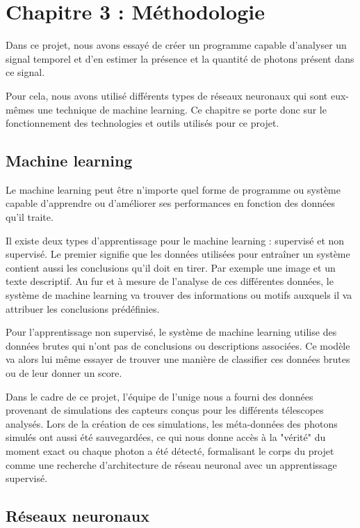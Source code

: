 \chapter{Chapitre 3 : Méthodologie}

Dans ce projet, nous avons essayé de créer un programme capable d'analyser un signal temporel et 
d'en estimer la présence et la quantité de photons présent dans ce signal.

Pour cela, nous avons utilisé différents types de réseaux neuronaux qui sont eux-mêmes une technique de machine learning.
Ce chapitre se porte donc sur le fonctionnement des technologies et outils utilisés pour ce projet. 

\section{Machine learning}

Le machine learning peut être n'importe quel forme de programme ou système capable d'apprendre ou d'améliorer ses performances
en fonction des données qu'il traite.

Il existe deux types d'apprentissage pour le machine learning : supervisé et non supervisé.
Le premier signifie que les données utilisées pour entraîner un système contient aussi les conclusions qu'il doit en tirer.
Par exemple une image et un texte descriptif. Au fur et à mesure de l'analyse de ces différentes données, le système de machine learning
va trouver des informations ou motifs auxquels il va attribuer les conclusions prédéfinies.

Pour l'apprentissage non supervisé, le système de machine learning utilise des données brutes qui n'ont pas de conclusions ou descriptions associées.
Ce modèle va alors lui même essayer de trouver une manière de classifier ces données brutes ou de leur donner un score.

Dans le cadre de ce projet, l'équipe de l'\gls{unige} nous a fourni des données provenant de simulations des capteurs conçus pour les différents télescopes analysés.
Lors de la création de ces simulations, les méta-données des photons simulés ont aussi été sauvegardées, ce qui nous donne accès
à la "vérité" du moment exact ou chaque photon a été détecté, formalisant le corps du projet comme une recherche d'architecture de réseau neuronal avec un apprentissage supervisé.

\section{Réseaux neuronaux}

